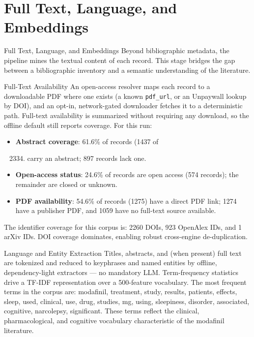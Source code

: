 \documentclass[
  ignorenonframetext,
]{beamer}
\author{\texorpdfstring{}{}}
\date{}
\providecommand{\tightlist}{%
  \setlength{\itemsep}{0pt}\setlength{\parskip}{0pt}}
\begin{document}
\section{Full Text, Language, and
Embeddings}\label{full-text-language-and-embeddings}

\begin{frame}[allowframebreaks]{Full Text, Language, and Embeddings}
Beyond bibliographic metadata, the pipeline mines the textual content of
each record. This stage bridges the gap between a bibliographic
inventory and a semantic understanding of the literature.
\end{frame}

\begin{frame}{Full-Text Availability}
\protect{}\label{full-text-availability}
An open-access resolver maps each record to a downloadable PDF where one
exists (a known \texttt{pdf\_url}, or an Unpaywall lookup by DOI), and
an opt-in, network-gated downloader fetches it to a deterministic path.
Full-text availability is summarized without requiring any download, so
the offline default still reports coverage. For this run:

\begin{itemize}
\tightlist
\item
  \textbf{Abstract coverage}: 61.6\% of records (1437 of

  \begin{enumerate}
  [1)]
  \setcounter{enumi}{2333}
  \tightlist
  \item
    carry an abstract; 897 records lack one.
  \end{enumerate}
\item
  \textbf{Open-access status}: 24.6\% of records are open access (574
  records); the remainder are closed or unknown.
\item
  \textbf{PDF availability}: 54.6\% of records (1275) have a direct PDF
  link; 1274 have a publisher PDF, and 1059 have no full-text source
  available.
\end{itemize}

The identifier coverage for this corpus is: 2260 DOIs, 923 OpenAlex IDs,
and 1 arXiv IDs. DOI coverage dominates, enabling robust cross-engine
de-duplication.
\end{frame}

\begin{frame}[allowframebreaks]{Language and Entity Extraction}
\protect{}\label{language-and-entity-extraction}
Titles, abstracts, and (when present) full text are tokenized and
reduced to keyphrases and named entities by offline, dependency-light
extractors --- no mandatory LLM. Term-frequency statistics drive a
TF-IDF representation over a 500-feature vocabulary. The most frequent
terms in the corpus are: modafinil, treatment, study, results, patients,
effects, sleep, used, clinical, use, drug, studies, mg, using,
sleepiness, disorder, associated, cognitive, narcolepsy, significant.
These terms reflect the clinical, pharmacological, and cognitive
vocabulary characteristic of the modafinil literature.
\end{frame}
\end{document}
